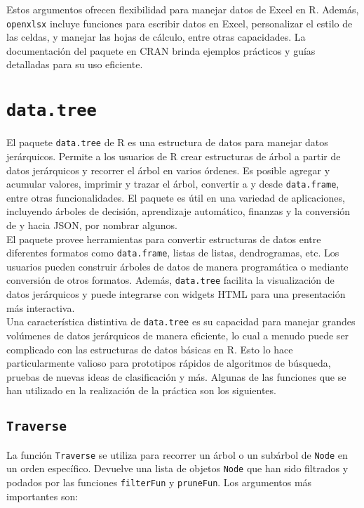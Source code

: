 \documentclass[12pt]{report}\usepackage[]{graphicx}\usepackage[dvipsnames]{xcolor}
\begin{document}
		 	Estos argumentos ofrecen flexibilidad para manejar datos de Excel en R. Además, \texttt{openxlsx} incluye funciones para escribir datos en Excel, personalizar el estilo de las celdas, y manejar las hojas de cálculo, entre otras capacidades. La documentación del paquete en CRAN brinda ejemplos prácticos y guías detalladas para su uso eficiente.
 	
 		\section{\texttt{data.tree}}
 	
		 	El paquete \texttt{data.tree} de R es una estructura de datos para manejar datos jerárquicos. Permite a los usuarios de R crear estructuras de árbol a partir de datos jerárquicos y recorrer el árbol en varios órdenes. Es posible agregar y acumular valores, imprimir y trazar el árbol, convertir a y desde \texttt{data.frame}, entre otras funcionalidades. El paquete es útil en una variedad de aplicaciones, incluyendo árboles de decisión, aprendizaje automático, finanzas y la conversión de y hacia JSON, por nombrar algunos.\\
		 	
		 	El paquete provee herramientas para convertir estructuras de datos entre diferentes formatos como \texttt{data.frame}, listas de listas, dendrogramas, etc. Los usuarios pueden construir árboles de datos de manera programática o mediante conversión de otros formatos. Además, \texttt{data.tree} facilita la visualización de datos jerárquicos y puede integrarse con widgets HTML para una presentación más interactiva.\\
		 	
		 	Una característica distintiva de \texttt{data.tree} es su capacidad para manejar grandes volúmenes de datos jerárquicos de manera eficiente, lo cual a menudo puede ser complicado con las estructuras de datos básicas en R. Esto lo hace particularmente valioso para prototipos rápidos de algoritmos de búsqueda, pruebas de nuevas ideas de clasificación y más. Algunas de las funciones que se han utilizado en la realización de la práctica son los siguientes.
 	
 			\subsection{\texttt{Traverse}}
 	
			 	La función \texttt{Traverse} se utiliza para recorrer un árbol o un subárbol de \texttt{Node} en un orden específico. Devuelve una lista de objetos \texttt{Node} que han sido filtrados y podados por las funciones \texttt{filterFun} y \texttt{pruneFun}. Los argumentos más importantes son:
			 	
\end{document}

